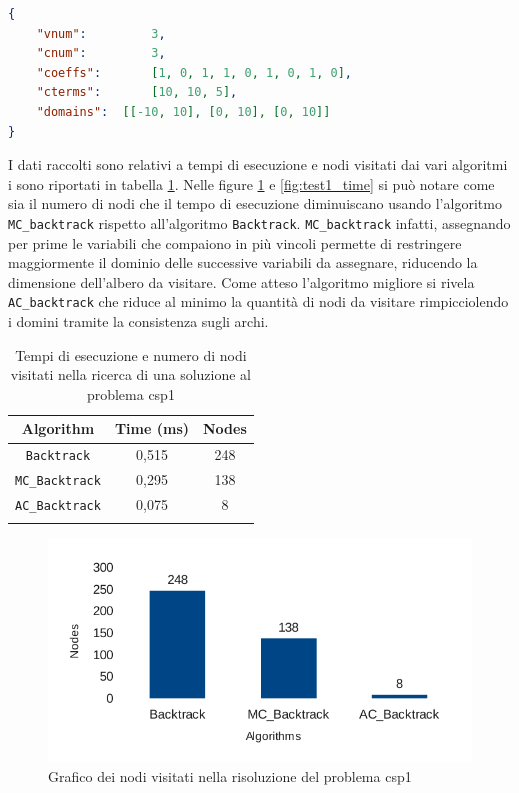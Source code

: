 \documentclass[10pt, a4paper]{article}
\begin{document}
\begin{lstlisting}[language=json, caption=csp1: problema sul quale è stata eseguita la prima batteria di test, label=lst:csp1]
{
	"vnum": 		3,
	"cnum":			3,
	"coeffs":		[1, 0, 1, 1, 0, 1, 0, 1, 0],
	"cterms":		[10, 10, 5],
	"domains":	[[-10, 10], [0, 10], [0, 10]]
}
\end{lstlisting}

I dati raccolti sono relativi a tempi di esecuzione e nodi visitati dai vari algoritmi i sono riportati in tabella \ref{tab:test1}.
Nelle figure \ref{fig:test1_nodes} e \ref{fig:test1_time} si può notare come sia il numero di nodi che il tempo di esecuzione diminuiscano usando l'algoritmo \texttt{MC\_backtrack} rispetto all'algoritmo \texttt{Backtrack}. \texttt{MC\_backtrack} infatti, assegnando per prime le variabili che compaiono in più vincoli permette di restringere maggiormente il dominio delle successive variabili da assegnare, riducendo la dimensione dell'albero da visitare. Come atteso l'algoritmo migliore si rivela \texttt{AC\_backtrack} che riduce al minimo la quantità di nodi da visitare rimpicciolendo i domini tramite la consistenza sugli archi.

\begin{longtable}{c c c}
\toprule
\textbf{Algorithm} & \textbf{Time (ms)} & \textbf{Nodes}\\
\midrule
\texttt{Backtrack} & 0,515 & 248 \\
\midrule
\texttt{MC\_Backtrack} & 0,295 & 138 \\
\midrule
\texttt{AC\_Backtrack} & 0,075 & 8 \\
\bottomrule
\caption{Tempi di esecuzione e numero di nodi visitati nella ricerca di una soluzione al problema csp1}
\label{tab:test1}
\end{longtable}

\begin{figure}[!h]
\begin{center}
\includegraphics[scale=0.7]{./report-images/test1_nodes.pdf}
\caption{Grafico dei nodi visitati nella risoluzione del problema csp1}
\label{fig:test1_nodes}
\end{center}
\end{figure}
\end{document}
